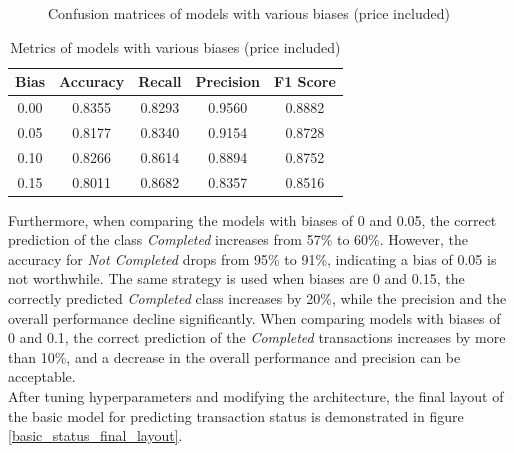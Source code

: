 \documentclass[12pt,twoside]{report}
\begin{document}
\begin{figure}[!htbp]
	\hfill
	\caption{Confusion matrices of models with various biases (price included)}
	\label{status_bias_cm}
\end{figure}

\begin{table}[!htbp]
	\centering
	\caption{Metrics of models with various biases (price included)}
	\label{status_bias_metrics}
	\begin{tabular}{| c | c | c | c | c |}
		\hline
		Bias & Accuracy & Recall & Precision & F1 Score \\
		\hline
		0.00 & 0.8355 & 0.8293 & 0.9560 & 0.8882 \\
		\hline
		0.05 & 0.8177 & 0.8340 & 0.9154 & 0.8728 \\
		\hline
		0.10 & 0.8266 & 0.8614 & 0.8894 & 0.8752 \\
		\hline
		0.15 & 0.8011 & 0.8682 & 0.8357 & 0.8516 \\
		\hline
	\end{tabular}
\end{table}

Furthermore, when comparing the models with biases of 0 and 0.05, the correct prediction of the class \textit{Completed} increases from 57\% to 60\%. However, the accuracy for \textit{Not Completed} drops from 95\% to 91\%, indicating a bias of 0.05 is not worthwhile. The same strategy is used when biases are 0 and 0.15, the correctly predicted \textit{Completed} class increases by 20\%, while the precision and the overall performance decline significantly. When comparing models with biases of 0 and 0.1, the correct prediction of the \textit{Completed} transactions increases by more than 10\%, and a decrease in the overall performance and precision can be acceptable. 
\\

After tuning hyperparameters and modifying the architecture, the final layout of the basic model for predicting transaction status is demonstrated in figure \ref{basic_status_final_layout}. 
\end{document}

